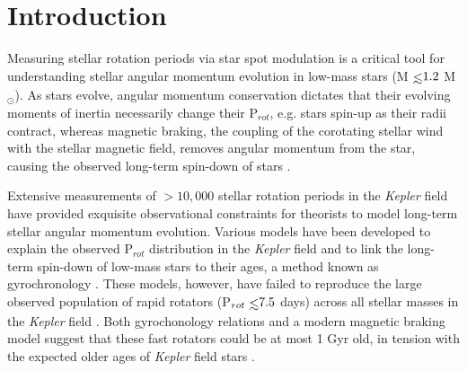 \documentclass[twocolumn]{aastex61}
\def\lsim{~\rlap{$<$}{\lower 1.0ex\hbox{$\sim$}}}
\begin{document}



\section{Introduction} \label{sec:intro}

Measuring stellar rotation periods via star spot modulation is a critical tool for understanding stellar angular momentum evolution in low-mass stars (M$\lsim 1.2$ M$_{\odot}$). As stars evolve, angular momentum conservation dictates that their evolving moments of inertia necessarily change their P$_{rot}$, e.g. stars spin-up as their radii contract, whereas magnetic braking, the coupling of the corotating stellar wind with the stellar magnetic field, removes angular momentum from the star, causing the observed long-term spin-down of stars \citep{Parker1958,Skumanich1972}.  

Extensive measurements of ${>}10,000$ stellar rotation periods in the \textit{Kepler} field \citep{Borucki2010,McQuillan2013,Reinhold2013,McQuillan2014,Reinhold2015,Lurie2017} have provided exquisite observational constraints for theorists to model long-term stellar angular momentum evolution. Various models have been developed to explain the observed P$_{rot}$ distribution in the \textit{Kepler} field \citep[e.g.][]{Matt2015,vanSaders2018} and to link the long-term spin-down of low-mass stars to their ages, a method known as gyrochronology \citep{Skumanich1972,Barnes2003,Barnes2007,Mamajek2008,Barnes2010}. These models, however, have failed to reproduce the large observed population of rapid rotators (P$_{rot} {\lsim} 7.5$ days) across all stellar masses in the \textit{Kepler} field \citep{McQuillan2013,McQuillan2014}.  Both gyrochonology relations \citep{McQuillan2014} and a modern magnetic braking model \citep{Matt2015} suggest that these fast rotators could be at most 1 Gyr old, in tension with the expected older ages of \textit{Kepler} field stars \citep{Chaplin2014,Angus2015}.
\end{document}
